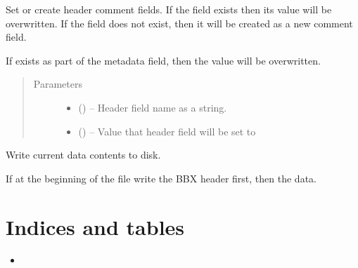 \documentclass[letterpaper,10pt,english]{sphinxmanual}
\begin{document}
\begin{fulllineitems}
\begin{fulllineitems}
Set or create header comment fields. If the field  exists then its value will be overwritten.
If the field does not exist, then it will be created as a new comment field.

If  exists as part of the metadata field, then the value will be overwritten.
\begin{quote}\begin{description}
\item[{Parameters}] \leavevmode\begin{itemize}
\item {} 
 () -- Header field name as a string.

\item {} 
 (\sphinxstyleliteralemphasis{, }\sphinxstyleliteralemphasis{, }) -- Value that header field will be set to

\end{itemize}

\end{description}\end{quote}

\end{fulllineitems}


\begin{fulllineitems}
\label{index:lofasm.bbx.bbx.LofasmFile.write}
Write current data contents to disk.

If at the beginning of the file write the BBX header first, then the data.

\end{fulllineitems}


\end{fulllineitems}



\chapter{Indices and tables}
\label{index:indices-and-tables}\label{index:welcome-to-lofasm-s-documentation}\begin{itemize}
\item {} 

\end{itemize}



\renewcommand{\indexname}{Index}
\printindex
\end{document}
